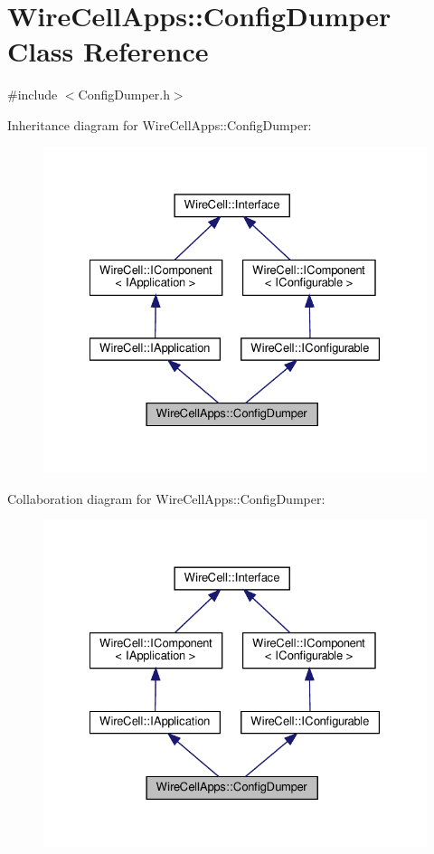 \hypertarget{class_wire_cell_apps_1_1_config_dumper}{}\section{Wire\+Cell\+Apps\+:\+:Config\+Dumper Class Reference}
\label{class_wire_cell_apps_1_1_config_dumper}


{\ttfamily \#include $<$Config\+Dumper.\+h$>$}



Inheritance diagram for Wire\+Cell\+Apps\+:\+:Config\+Dumper\+:
\nopagebreak
\begin{figure}[H]
\begin{center}
\leavevmode
\includegraphics[width=328pt]{class_wire_cell_apps_1_1_config_dumper__inherit__graph}
\end{center}
\end{figure}


Collaboration diagram for Wire\+Cell\+Apps\+:\+:Config\+Dumper\+:
\nopagebreak
\begin{figure}[H]
\begin{center}
\leavevmode
\includegraphics[width=328pt]{class_wire_cell_apps_1_1_config_dumper__coll__graph}
\end{center}
\end{figure}
